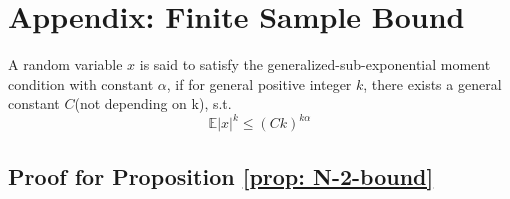 \section{Appendix: Finite Sample Bound}
\begin{definition}
	\label{def:generalized-sub-exponential-mc}
	A random variable $x$ is said to satisfy the generalized-sub-exponential moment condition with constant $\alpha$, if for general positive integer $k$, there exists a general constant $C$(not depending on k), s.t. 
	\begin{equation}
	\mathbb{E} |x|^k \le (Ck)^{k \alpha}
	\end{equation}
\end{definition}



\subsection*{Proof for Proposition \ref{prop: N-2-bound}}
